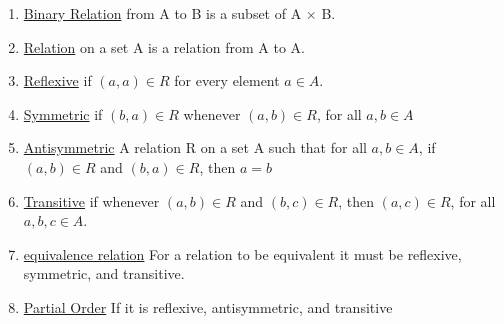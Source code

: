 \documentclass[12pt]{article}
\begin{document}
\begin{enumerate}
\item \underline{Binary Relation} from A to B is a subset of A $\times$ B.
\item \underline{Relation} on a set A is a relation from A to A.
\item \underline{Reflexive} if $(a, a) \in R$ for every element $a \in A.$
\item \underline{Symmetric} if $(b, a) \in R$ whenever $(a, b) \in R$, for all $a, b \in A$
\item \underline{Antisymmetric} A relation R on a set A such that for all $a, b \in A$, if $(a, b) \in R$ and $(b, a) \in R$, then $a = b$
\item \underline{Transitive} if whenever $(a, b) \in R$ and $(b, c) \in R$, then $(a, c) \in R$, for all $a,b,c \in A$.
\item \underline{equivalence relation} For a relation to be equivalent it must be reflexive, symmetric, and transitive.
\item \underline{Partial Order} If it is reflexive, antisymmetric, and transitive
\end{enumerate}
\end{document}
